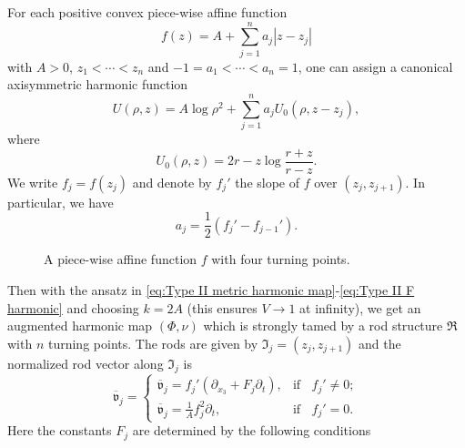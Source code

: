 \documentclass[a4paper,11pt]{amsart}
\theoremstyle{definition}
\numberwithin{equation}{section}
\newcommand{\mv} {\mathfrak v}
\newcommand{\mI} {\mathfrak I}
\newcommand{\mR} {\mathfrak R}
\begin{document}
For each positive convex piece-wise affine function
\begin{equation}
    f(z)=A+\sum_{j=1}^na_j|z-z_j|
\end{equation}
with  $A>0$, $z_1<\cdots <z_n$ and $-1=a_1<\cdots< a_n=1$, one can assign a canonical axisymmetric harmonic function
\begin{equation}
    U(\rho,z)=A\log\rho^2+\sum_{j=1}^na_j U_0(\rho,z-z_j),
\end{equation}
where
$$U_0(\rho,z)=2r-z\log\frac{r+z}{r-z}.$$
We write $f_j=f(z_j)$ and denote by $f_j'$  the slope of $f$ over $(z_j,z_{j+1})$. In particular, we have $$a_j=\frac12(f_j'-f_{j-1}').$$
\begin{figure}[ht]
	\caption{A piece-wise affine function $f$ with four turning points.}
	 \label{Figure:piece-wise affine function}   
\end{figure}
Then with the ansatz in \eqref{eq:Type II metric harmonic map}-\eqref{eq:Type II F harmonic} and choosing $k=2A$ (this ensures $V\to1$ at infinity), we get an augmented harmonic map $(\Phi,\nu)$ which is strongly tamed by a rod structure $\mR$ with $n$ turning points.  The rods are given by $\mathfrak{I}_j=(z_j,z_{j+1})$ and the normalized rod vector along $\mI_j$ is
\begin{equation}\label{eq:BG normailzed rod vector}
    \overline{\mv}_j=
    \begin{cases}
         \overline{\mathfrak{v}}_j=f_j'(\partial_{x_3}+F_j\partial_t), & \text{if} \ \ \ \  f_j'\neq 0; \\
         \overline{\mathfrak v}_j=\frac{1}{A}f_j^2\partial_t,  & \text{if} \ \ \ \  f_j'=0.
         \end{cases}
\end{equation}
Here the constants $F_j$ are determined by the following conditions 
\end{document}
